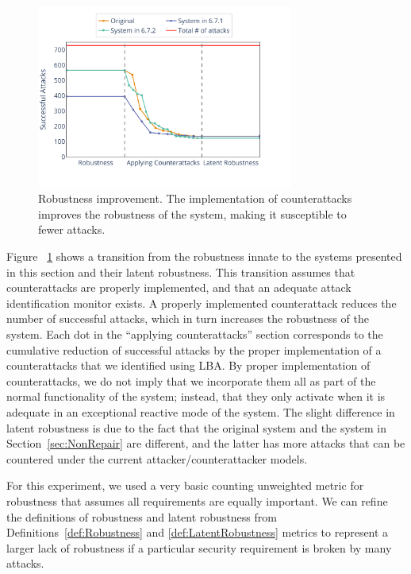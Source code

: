 {{\begin{figure}[t]
  \includegraphics[width=0.75\textwidth]{Figures/Robustness.pdf} 
  
  \caption{Robustness improvement. The implementation of counterattacks improves the robustness of the system, making it susceptible to fewer attacks.}
  \label{fig:Robustness}
\end{figure}
Figure ~\ref{fig:Robustness} shows a transition from the robustness innate to the systems presented in this section and their latent robustness. This transition assumes that counterattacks are properly implemented, and that an adequate attack identification monitor exists. A properly implemented counterattack reduces the number of successful attacks, which in turn increases the robustness of the system. Each dot in the ``applying counterattacks'' section corresponds to the cumulative reduction of successful attacks by the proper implementation of a counterattacks that we identified using LBA. By proper implementation of counterattacks, we do not imply that we incorporate them all as part of the normal functionality of the system; instead, that they only activate when it is adequate in an exceptional reactive mode of the system. The slight difference in latent robustness is due to the fact that the original system and the system in Section~\ref{sec:NonRepair} are different, and the latter has more attacks that can be countered under the current attacker/counterattacker models. 

For this experiment, we used a very basic counting unweighted metric for robustness that assumes all requirements are equally important. We can refine the definitions of robustness and latent robustness from Definitions~\ref{def:Robustness} and \ref{def:LatentRobustness} metrics to represent a larger lack of robustness if a particular security requirement is broken by many attacks. 

}}
